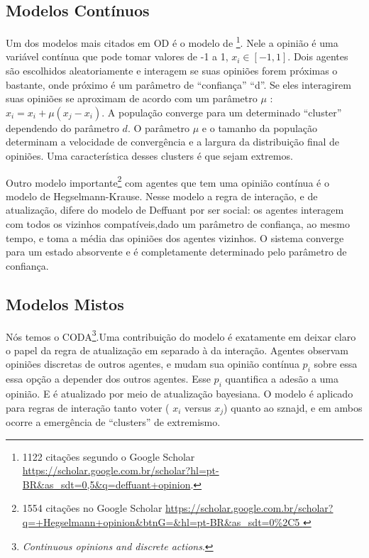 \subsection{Modelos Contínuos}

\quad \quad Um dos modelos mais citados em OD é o modelo de
\footnote{1122 citações segundo o Google Scholar
  \url{https://scholar.google.com.br/scholar?hl=pt-BR&as_sdt=0,5&q=deffuant+opinion}.}.
Nele a opinião é uma variável contínua que pode tomar valores de -1 a 1, $x_i \in
[-1,1]$. Dois agentes são escolhidos aleatoriamente e interagem se suas opiniões
forem próximas o bastante, onde próximo é um parâmetro de ``confiança'' ``d''.
Se eles interagirem suas opiniões se aproximam de acordo com um parâmetro $\mu$ :
$x_i = x_i + \mu(x_j - x_i)$. A população converge para um determinado ``cluster''
dependendo do parâmetro $d$. O parâmetro $\mu$ e o tamanho da população determinam
a velocidade de convergência e a largura da distribuição final de opiniões. Uma
característica desses clusters é que sejam extremos.

Outro modelo importante\footnote{1554 citações no Google Scholar
  \url{https://scholar.google.com.br/scholar?q=+Hegselmann+opinion&btnG=&hl=pt-BR&as_sdt=0\%2C5
  }} com agentes que tem uma opinião contínua é o modelo de Hegselmann-Krause.
Nesse modelo a regra de interação, e de atualização, difere do modelo de
Deffuant por ser social: os agentes interagem com todos os vizinhos
compatíveis,dado um parâmetro de confiança, ao mesmo tempo, e toma a média das
opiniões dos agentes vizinhos. O sistema converge para um estado absorvente e é
completamente determinado pelo parâmetro de confiança.




\subsection{Modelos Mistos}

\quad \quad Nós temos o CODA\cite{martins2008continuous}\footnote{\textit{Continuous
    opinions and discrete actions}.}.Uma contribuição do modelo é exatamente em
deixar claro o papel da regra de atualização em separado à da interação. Agentes
observam opiniões discretas de outros agentes, e mudam sua opinião contínua
$p_i$ sobre essa essa opção a depender dos outros agentes. Esse $p_i$ quantifica
a adesão a uma opinião. E é atualizado por meio de atualização bayesiana. O
modelo é aplicado para regras de interação tanto voter ( $x_i $ versus $x_j$)
quanto ao sznajd, e em ambos ocorre a emergência de ``clusters'' de extremismo.

